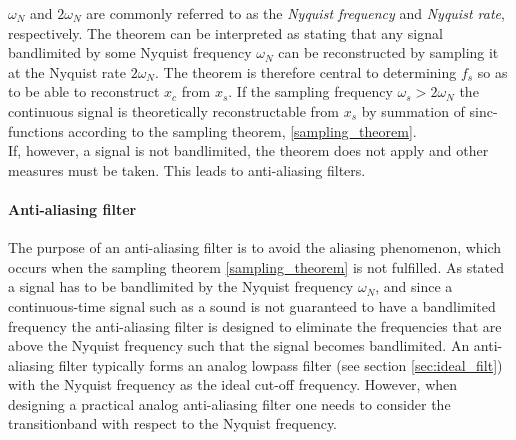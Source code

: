 $\omega_N$ and $2\omega_N$ are commonly referred to as the \textit{Nyquist frequency} and \textit{Nyquist rate}, respectively. The theorem can be interpreted as stating that any signal bandlimited by some Nyquist frequency $\omega_N$ can be reconstructed by sampling it at the Nyquist rate $2\omega_N$. The theorem is therefore central to determining $f_s$ so as to be able to reconstruct $x_c$ from $x_s$. If the sampling frequency $\omega_s>2\omega_N$ the continuous signal is theoretically reconstructable from $x_s$ by summation of sinc-functions according to the sampling theorem, \ref{sampling_theorem}.\\
If, however, a signal is not bandlimited, the theorem does not apply and other measures must be taken. This leads to anti-aliasing filters. 

\paragraph{Anti-aliasing filter}
The purpose of an anti-aliasing filter is to avoid the aliasing phenomenon, which occurs when the sampling theorem \ref{sampling_theorem} is not fulfilled. As stated a signal has to be bandlimited by the Nyquist frequency $\omega_N$, and since a continuous-time signal such as a sound is not guaranteed to have a bandlimited frequency the anti-aliasing filter is designed to eliminate the frequencies that are above the Nyquist frequency such that the signal becomes bandlimited.
An anti-aliasing filter typically forms an analog lowpass filter (see section \ref{sec:ideal_filt}) with the Nyquist frequency as the ideal cut-off frequency. However, when designing a practical analog anti-aliasing filter one needs to consider the transitionband with respect to the Nyquist frequency.


